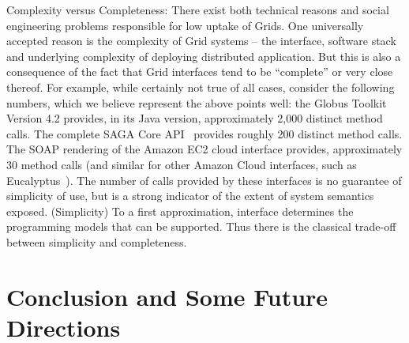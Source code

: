 \documentclass[conference,final]{IEEEtran}
\begin{document}
Complexity versus Completeness: There exist both technical reasons and
social engineering problems responsible for low uptake of Grids. One
universally accepted reason is the complexity of Grid systems -- the
interface, software stack and underlying complexity of deploying
distributed application. But this is also a consequence of the fact
that Grid interfaces tend to be ``complete'' or very close thereof.
For example, while certainly not true of all cases, consider the
following numbers, which we believe represent the above points well:
the Globus Toolkit Version 4.2 provides, in its Java version,
approximately 2,000 distinct method calls.  The complete SAGA Core
API~\cite{saga-core} provides roughly 200 distinct method calls.  The
SOAP rendering of the Amazon EC2 cloud interface provides,
approximately 30 method calls (and similar for other Amazon Cloud
interfaces, such as Eucalyptus~\cite{eucalyptus_url}).  The number of
calls provided by these interfaces is no guarantee of simplicity of
use, but is a strong indicator of the extent of system semantics
exposed.  (Simplicity) To a first approximation, interface determines
the programming models that can be supported. Thus there is the
classical trade-off between simplicity and completeness.

\section{Conclusion and Some Future Directions}


\end{document}
